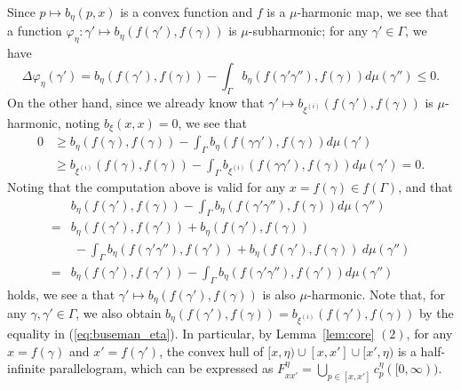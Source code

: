 \documentclass[12pt]{amsart}
\numberwithin{equation}{section}
\theoremstyle{plain}
\theoremstyle{definition}
\theoremstyle{remark}
\newcommand{\xxi}[1]{\xi^{(#1)}}
\newcommand{\ray}[1]{[#1)}
\begin{document}
 Since $p \mapsto b_{\eta}(p,x)$ is a convex function and 
 $f$ is a $\mu$-harmonic map, we see that a function
 $\varphi_{\eta}\colon \gamma' \mapsto b_{\eta}(f(\gamma'),f(\gamma))$
 is $\mu$-subharmonic; for any $\gamma' \in \Gamma$, we have
\begin{equation*}
 \Delta \varphi_{\eta}(\gamma') 
 = b_{\eta}(f(\gamma'),f(\gamma)) - 
  \int_{\Gamma} b_{\eta}(f(\gamma' \gamma''),f(\gamma)) d\mu(\gamma'')
  \leq 0. 
\end{equation*}
 On the other hand, since  we already know that 
 $\gamma' \mapsto b_{\xxi{i}}(f(\gamma'),f(\gamma))$ is $\mu$-harmonic,
 noting $b_{\xi}(x,x)=0$, we see that
\begin{equation}
 \label{eq:buseman_eta}
 \begin{split}
  0 & \geq b_{\eta}(f(\gamma),f(\gamma)) 
     - \int_{\Gamma} b_{\eta}(f(\gamma \gamma'),f(\gamma)) d\mu(\gamma') \\
    & \geq  b_{\xxi{i}}(f(\gamma),f(\gamma)) 
     - \int_{\Gamma} b_{\xxi{i}}(f(\gamma \gamma'),f(\gamma)) d\mu(\gamma') 
     = 0. 
 \end{split}
\end{equation}
 Noting that the computation above is valid for any 
 $x=f(\gamma) \in f(\Gamma)$, and that 
\begin{equation*}
\begin{split}
  &  b_{\eta}(f(\gamma'),f(\gamma)) 
  -\int_{\Gamma} b_{\eta}(f(\gamma' \gamma''),f(\gamma)) d\mu(\gamma'') \\
  =&   b_{\eta}(f(\gamma'),f(\gamma'))+ b_{\eta}(f(\gamma'),f(\gamma)) \\
   & \ -\int_{\Gamma} b_{\eta}(f(\gamma' \gamma''),f(\gamma')) + 
    b_{\eta}(f(\gamma'),f(\gamma)) \ d\mu(\gamma'') \\
 =&   b_{\eta}(f(\gamma'),f(\gamma')) 
  -\int_{\Gamma} b_{\eta}(f(\gamma' \gamma''),f(\gamma')) d\mu(\gamma'')
\end{split}
\end{equation*}
 holds, we see a that $\gamma' \mapsto b_{\eta}(f(\gamma'),f(\gamma))$
 is also $\mu$-harmonic. 
 Note that, for any $\gamma, \gamma'\in \Gamma$, we also obtain 
 $b_{\eta}(f(\gamma'),f(\gamma))=b_{\xxi{i}}(f(\gamma'),f(\gamma))$
 by the equality in (\ref{eq:buseman_eta}).
 In particular, by 
 Lemma~\ref{lem:core} $(2)$, 
 for any $x=f(\gamma)$ and $x'=f(\gamma')$,  the convex hull of 
 $\ray{x,\eta}\cup [x,x']\cup \ray{x',\eta}$ is a half-infinite
 parallelogram, which can be expressed as 
 $F_{xx'}^{\eta}=\bigcup_{p \in [x,x']}c_p^{\eta}([0,\infty))$. 
\end{document}

